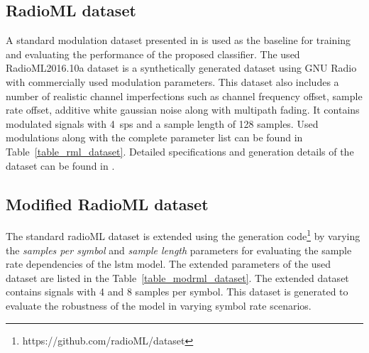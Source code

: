 \subsection{RadioML dataset}
A standard modulation dataset presented in \cite{o2016radio} is used as the baseline for training and evaluating the performance of the proposed classifier. The used RadioML2016.10a dataset is a synthetically generated dataset using GNU Radio \cite{gnuradio_web} with commercially used modulation parameters. This dataset also includes a number of realistic channel imperfections such as channel frequency offset, sample rate offset, additive white gaussian noise along with multipath fading. It contains modulated signals with 4~\ac{sps} and a sample length of 128 samples. Used modulations along with the complete parameter list can be found in Table~\ref{table_rml_dataset}. Detailed specifications and generation details of the dataset can be found in \cite{o2016radio}.

\subsection{Modified RadioML dataset}
The standard radioML dataset is extended using the generation code\footnote{https://github.com/radioML/dataset} by varying the \textit{samples per symbol} and \textit{sample length} parameters for evaluating the sample rate dependencies of the \ac{lstm} model. The extended parameters of the used dataset are listed in the Table~\ref{table_modrml_dataset}. The extended dataset contains signals with 4 and 8 samples per symbol. This dataset is generated to evaluate the robustness of the model in varying symbol rate scenarios. 



